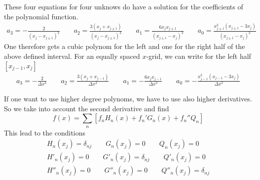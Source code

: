 These four equations for four unknows do have a solution for the coefficients
of the polynomial function.
\begin{eqnarray*}
  a_3 = -\frac{2}{(x_j-x_{j\pm1})^3}
  \qquad
  a_2 = \frac{3 (x_j+x_{j\pm1})}{(x_j-x_{j\pm1})^3}
  \qquad
  a_1 = \frac{6 x_j x_{j\pm1}}{(x_{j\pm1}-x_j)^3}
  \qquad
  a_0 = \frac{x_{j\pm1}^2 (x_{j\pm1}-3x_j)}{(x_{j\pm1}-x_j)^3}
\end{eqnarray*}
One therefore gets a cubic polynom for the left and one for the right half of
the above defined interval.
For an equally spaced $x$-grid, we can write for the left half $[x_{j-1},x_j]$
\begin{eqnarray*}
  a_3 = -\frac{2}{\Delta x^3}
  \qquad
  a_2 = \frac{3 (x_j+x_{j-1})}{\Delta x^3}
  \qquad
  a_1 = -\frac{6 x_j x_{j-1}}{\Delta x^3}
  \qquad
  a_0 = -\frac{x_{j-1}^2 (x_{j-1}-3x_j)}{\Delta x^3}
\end{eqnarray*}


If one want to use higher degree polynoms, we have to use
also higher derivatives. So we take into account the second derivative
and find
\begin{displaymath}
  f(x)=\sum_n\left[ f_n H_n(x) + f_n' G_n(x) + f_n'' Q_n\right]
\end{displaymath}
This lead to the conditions
\begin{eqnarray*}
  H_n(x_j)=\delta_{nj}\qquad G_n(x_j)=0\qquad Q_n(x_j)=0\\
  H'_n(x_j)=0\qquad G'_n(x_j)=\delta_{nj}\qquad Q'_n(x_j)=0\\
  H''_n(x_j)=0\qquad G''_n(x_j)=0\qquad Q''_n(x_j)=\delta_{nj}
\end{eqnarray*}




